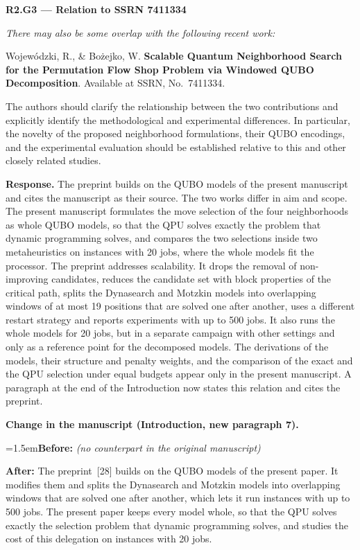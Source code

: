 \documentclass[12pt]{article}
\newenvironment{rc}[1]{\par\medskip\noindent\textbf{#1}\par\nopagebreak\noindent\itshape\renewcommand{\emph}[1]{\textbf{##1}}\ignorespaces}{\par}
\newcommand{\answer}[1]{\par\smallskip\noindent\textbf{Response.} #1\par}
\newcommand{\change}[3]{\par\smallskip\noindent\textbf{Change in the manuscript (#1).}\par
  {\leftskip=1.5em\noindent\textbf{Before:} #2\par\noindent\textbf{After:} #3\par}}
\begin{document}
\begin{rc}{R2.G3 --- Relation to SSRN 7411334}
There may also be some overlap with the following recent work:

Wojewódzki, R., \& Bożejko, W. \emph{Scalable Quantum Neighborhood Search for the Permutation Flow Shop Problem via Windowed QUBO Decomposition}. Available at SSRN, No.~7411334.

The authors should clarify the relationship between the two contributions and explicitly identify the methodological and experimental differences. In particular, the novelty of the proposed neighborhood formulations, their QUBO encodings, and the experimental evaluation should be established relative to this and other closely related studies.
\end{rc}
\answer{The preprint builds on the QUBO models of the present manuscript and cites the manuscript as their source. The two works differ in aim and scope. The present manuscript formulates the move selection of the four neighborhoods as whole QUBO models, so that the QPU solves exactly the problem that dynamic programming solves, and compares the two selections inside two metaheuristics on instances with 20 jobs, where the whole models fit the processor. The preprint addresses scalability. It drops the removal of non-improving candidates, reduces the candidate set with block properties of the critical path, splits the Dynasearch and Motzkin models into overlapping windows of at most 19 positions that are solved one after another, uses a different restart strategy and reports experiments with up to 500 jobs. It also runs the whole models for 20 jobs, but in a separate campaign with other settings and only as a reference point for the decomposed models. The derivations of the models, their structure and penalty weights, and the comparison of the exact and the QPU selection under equal budgets appear only in the present manuscript. A paragraph at the end of the Introduction now states this relation and cites the preprint.}
\change{Introduction, new paragraph 7}{\textit{(no counterpart in the original manuscript)}}{The preprint~[28] builds on the QUBO models of the present paper. It modifies them and splits the Dynasearch and Motzkin models into overlapping windows that are solved one after another, which lets it run instances with up to 500 jobs. The present paper keeps every model whole, so that the QPU solves exactly the selection problem that dynamic programming solves, and studies the cost of this delegation on instances with 20 jobs.}
\end{document}
